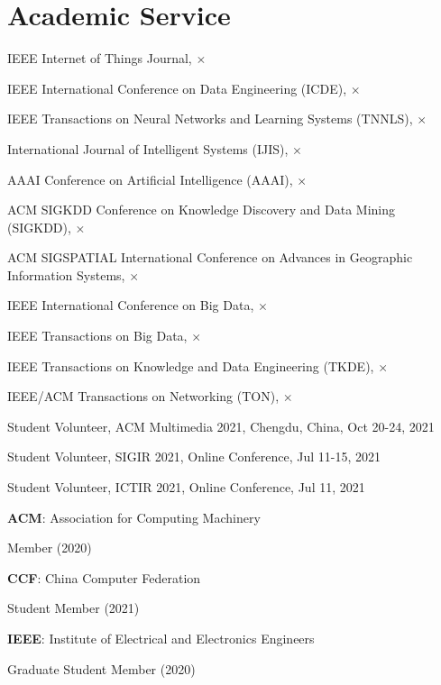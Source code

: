 \section*{Academic Service}


\indent

IEEE Internet of Things Journal, $\times$

IEEE International Conference on Data Engineering (ICDE), $\times$

IEEE Transactions on Neural Networks and Learning Systems (TNNLS), $\times$

International Journal of Intelligent Systems (IJIS), $\times$

AAAI Conference on Artificial Intelligence (AAAI), $\times$

ACM SIGKDD Conference on Knowledge Discovery and Data Mining (SIGKDD), $\times$

ACM SIGSPATIAL International Conference on Advances in Geographic Information Systems, $\times$

IEEE International Conference on Big Data, $\times$

IEEE Transactions on Big Data, $\times$

IEEE Transactions on Knowledge and Data Engineering (TKDE), $\times$

IEEE/ACM Transactions on Networking (TON), $\times$

\indent 

Student Volunteer, ACM Multimedia 2021, Chengdu, China, Oct 20-24, 2021

Student Volunteer, SIGIR 2021, Online Conference, Jul 11-15, 2021

Student Volunteer, ICTIR 2021, Online Conference, Jul 11, 2021

\indent 

\textbf{ACM}: Association for Computing Machinery 

\hspace{2em}Member (2020)

\textbf{CCF}: China Computer Federation

\hspace{2em}Student Member (2021)

\textbf{IEEE}: Institute of Electrical and Electronics Engineers

\hspace{2em}Graduate Student Member (2020)